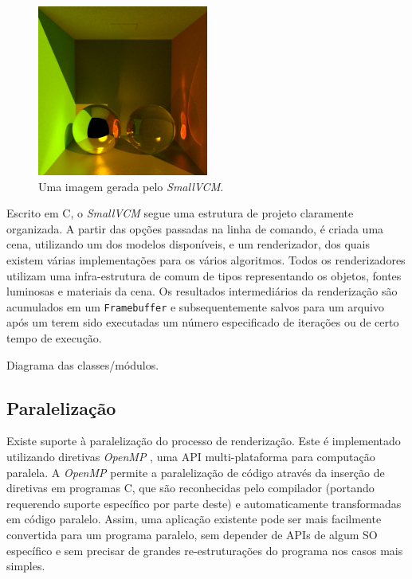 \documentclass[tg]{mdtufsm}
\def\Cpp{{C\nolinebreak[4]\raisebox{.20ex}{\small\bf++}}}
\newcommand{\todo}[1]{\textsf{\color{red}#1}}
\begin{document}
\begin{figure}
	\centering
	\includegraphics[width=0.5\textwidth]{ggbs_s_vcm}
	\caption{
		Uma imagem gerada pelo \emph{SmallVCM}.
	}
	\label{fig:smallvcm_img}
\end{figure}

Escrito em \Cpp, o \emph{SmallVCM} segue uma estrutura de projeto claramente organizada. A partir das opções passadas na linha de comando, é criada uma cena, utilizando um dos modelos disponíveis, e um renderizador, dos quais existem várias implementações para os vários algoritmos. Todos os renderizadores utilizam uma infra-estrutura de comum de tipos representando os objetos, fontes luminosas e materiais da cena. Os resultados intermediários da renderização são acumulados em um \texttt{Framebuffer} e subsequentemente salvos para um arquivo após um terem sido executadas um número especificado de iterações ou de certo tempo de execução.

\todo{Diagrama das classes/módulos.}

\subsection{Paralelização}

Existe suporte à paralelização do processo de renderização. Este é implementado utilizando diretivas \emph{OpenMP} \citep{openmp40}, uma API multi-plataforma para computação paralela. A \emph{OpenMP} permite a paralelização de código através da inserção de diretivas  em programas \Cpp, que são reconhecidas pelo compilador (portando requerendo suporte específico por parte deste) e automaticamente transformadas em código paralelo. Assim, uma aplicação existente pode ser mais facilmente convertida para um programa paralelo, sem depender de APIs de algum SO específico e sem precisar de grandes re-estruturações do programa nos casos mais simples.
\end{document}
